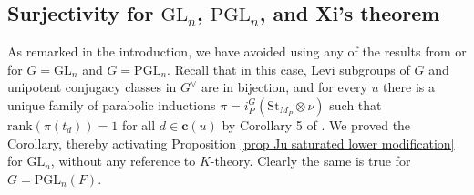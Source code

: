 \documentclass[10pt]{article}
\newcommand{\cc}{\mathbf{c}}
\newcommand{\GL}{\mathrm{GL}}
\newcommand{\PGL}{\mathrm{PGL}}
\newcommand{\St}{\mathrm{St}}
\theoremstyle{definition}
\theoremstyle{remark}
\newcommand{\Gd}{G^\vee}
\newcommand{\rank}{\mathrm{rank}}
\begin{document}
\subsection{Surjectivity for $\GL_n$, $\PGL_n$, and Xi's theorem}
\label{subsubsection Surj for GLn}
As remarked in the introduction, we have avoided using any of the results from \cite{XiAMemoir} or 
\cite{BO} for $G=\GL_n$ and $G=\PGL_n$. Recall that in this case, Levi subgroups of $G$ and unipotent conjugacy classes
in $\Gd$ are in bijection, and for every $u$ there is a unique family of parabolic inductions
$\pi=i_{P}^G(\St_{M_P}\otimes\nu)$ such that $\rank\left(\pi(t_d)\right)=1$ for all $d\in\cc(u)$
by Corollary 5 of \cite{Plancherel}. We proved the Corollary, thereby activating Proposition \ref{prop Ju saturated lower modification} for $\GL_n$, without any reference to $K$-theory.
Clearly the same is true for $G=\PGL_n(F)$.
\end{document}
